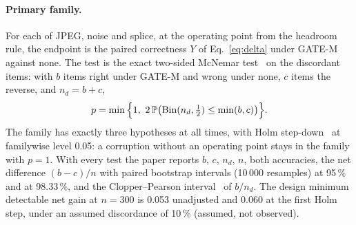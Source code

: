 \paragraph{Primary family.}
For each of JPEG, noise and splice, at the operating point from the headroom rule, the endpoint is the paired correctness
$Y$ of Eq.~\eqref{eq:delta} under GATE-M against none.
The test is the exact two-sided McNemar test~\cite{mcnemar1947} on the discordant items: with $b$ items right under GATE-M and
wrong under none, $c$ items the reverse, and $n_d=b+c$,
\begin{equation}
p=\min\Big\{1,\ 2\,\PP\big(\mathrm{Bin}(n_d,\tfrac12)\le\min(b,c)\big)\Big\}.
\label{eq:mcnemar}
\end{equation}
The family has exactly three hypotheses at all times, with Holm step-down~\cite{holm1979sequentially} at familywise level 0.05:
a corruption without an operating point stays in the family with $p=1$.
With every test the paper reports $b$, $c$, $n_d$, $n$, both accuracies, the net difference $(b-c)/n$ with paired bootstrap
intervals (10\,000 resamples) at 95\,\% and at 98.33\,\%, and the Clopper--Pearson interval~\cite{clopper1934} of $b/n_d$.
The design minimum detectable net gain at $n=300$ is 0.053 unadjusted and 0.060 at the first Holm step, under an assumed
discordance of 10\,\% (assumed, not observed).

